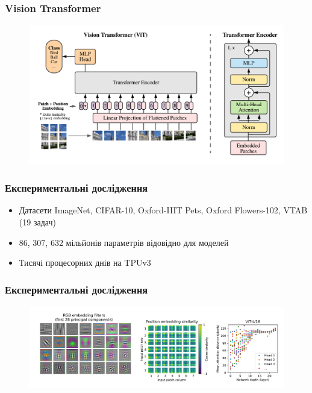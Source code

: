 \documentclass{beamer}
\begin{document}
\begin{frame}
    \frametitle{Vision Transformer}
    \begin{figure}[H]
        \centering
        \includegraphics[width=1\textwidth]{vision-transformer-arch.png}
    \end{figure}

\end{frame}

\begin{frame}
    \frametitle{Експериментальні дослідження}
    \begin{itemize}
        \item Датасети ImageNet, CIFAR-10, Oxford-IIIT Pets,
        Oxford Flowers-102, VTAB (19 задач)
        \item 86, 307, 632 мільйонів параметрів відовідно для моделей
        \item Тисячі процесорних днів на TPUv3
    \end{itemize}

\end{frame}

\begin{frame}
    \frametitle{Експериментальні дослідження}
    \begin{figure}[H]
        \centering
        \includegraphics[width=1\textwidth]{filters.png}
    \end{figure}

\end{frame}
\end{document}
